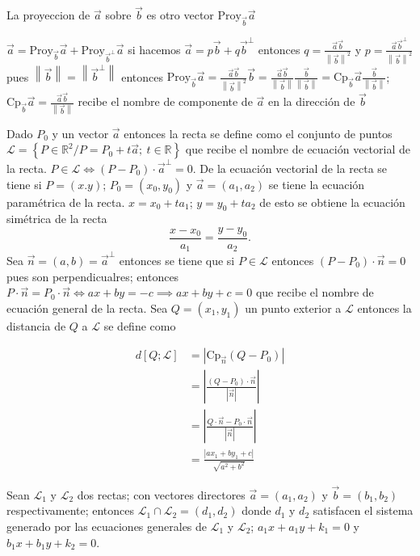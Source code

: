 \documentclass[10pt,]{krantz}
\theoremstyle{definition}
\theoremstyle{definition}
\theoremstyle{definition}
\theoremstyle{remark}
\begin{document}
La proyeccion de \(\vec{a}\) sobre \(\vec{b}\) es otro vector \(\text{Proy}_{\vec{b}}\vec{a}\)

\(\vec{a}=\text{Proy}_{\vec{b}}\vec{a}+\text{Proy}_{\vec{b}^\perp}\vec{a}\) si hacemos \(\vec{a}=p\vec{b}+q\vec{b}^\perp\) entonces \(q=\frac{\vec{a}\vec{b}}{\left\|\vec{b}\right\|^2}\) y \(p=\frac{\vec{a}\vec{b}^\perp}{\left\|\vec{b}\right\|^2}\) pues \(\left\|\vec{b}\right\|=\left\|\vec{b}^\perp\right\|\) entonces \(\text{Proy}_{\vec{b}}\vec{a}=\frac{\vec{a}\vec{b}}{\left\|\vec{b}\right\|^2}\vec{b}=\frac{\vec{a}\vec{b}}{\left\|\vec{b}\right\|}\frac{\vec{b}}{\left\|\vec{b}\right\|}=\text{Cp}_{\vec{b}}\vec{a}\frac{\vec{b}}{\left\|\vec{b}\right\|}\); \(\text{Cp}_{\vec{b}}\vec{a}=\frac{\vec{a}\vec{b}}{\left\|\vec{b}\right\|}\) recibe el nombre de componente de \(\vec{a}\) en la dirección de \(\vec{b}\)

Dado \(P_0\) y un vector \(\vec{a}\) entonces la recta se define como el conjunto de puntos \(\mathcal{L}=\left\{P\in\mathbb{R}^2/P=P_0+t\vec{a};\: t\in \mathbb{R}\right\}\) que recibe el nombre de ecuación vectorial de la recta. \(P\in\mathcal{L}\iff (P-P_0)\cdot\vec{a}^\perp=0\). De la ecuación vectorial de la recta se tiene si \(P=(x.y)\); \(P_0=(x_0,y_0)\) y \(\vec{a}=(a_1,a_2)\) se tiene la ecuación paramétrica de la recta. \(x=x_0+ta_1\); \(y=y_0+ta_2\) de esto se obtiene la ecuación simétrica de la recta \[\frac{x-x_0}{a_1}=\frac{y-y_0}{a_2}.\] Sea \(\vec{n}=(a,b)=\vec{a}^\perp\) entonces se tiene que si \(P\in \mathcal{L}\) entonces \((P-P_0)\cdot \vec{n}=0\) pues son perpendicualres; entonces \(P\cdot \vec{n}=P_0\cdot \vec{n}\iff ax+by=-c\implies ax+by+c=0\) que recibe el nombre de ecuación general de la recta. Sea \(Q=(x_1,y_1)\) un punto exterior a \(\mathcal{L}\) entonces la distancia de \(Q\) a \(\mathcal{L}\) se define como

\begin{align*}d[Q;\mathcal{L}] & =\left|\text{Cp}_{\vec{n}}(Q-P_0)\right| \\
& =\left|\frac{(Q-P_0)\cdot\vec{n}}{\left|\vec{n}\right|}\right| \\
& =\left|\frac{Q\cdot\vec{n}-P_0\cdot\vec{n}}{\left|\vec{n}\right|}\right| \\
& =\frac{\left|ax_1+by_1+c\right|}{\sqrt{a^2+b^2}}
\end{align*}

Sean \(\mathcal{L}_1\) y \(\mathcal{L}_2\) dos rectas; con vectores directores \(\vec{a}=(a_1,a_2)\) y \(\vec{b}=(b_1,b_2)\) respectivamente; entonces \(\mathcal{L}_1\cap\mathcal{L}_2=(d_1,d_2)\) donde \(d_1\) y \(d_2\) satisfacen el sistema generado por las ecuaciones generales de \(\mathcal{L}_1\) y \(\mathcal{L}_2\); \(a_1x+a_1y+k_1=0\) y \(b_1x+b_1y+k_2=0\).
\end{document}
